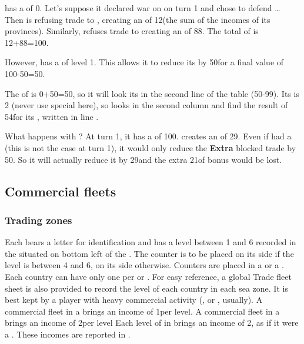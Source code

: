 
\begin{exemple}
  \POR has a  of 0. Let's suppose it declared
  war on \paysMaroc on turn 1 and \TUR chose to defend \paysMaroc\ldots
  Then \paysMaroc is refusing trade to \POR, creating an  of 12\ducats (the sum of the incomes of its
  provinces). Similarly, \TUR refuses trade to \POR creating an
   of 88\ducats. The total  of \POR is 12+88=100\ducats.

  However, \POR has a  \MNU of level 1. This allows it to
  reduce its  by 50\ducats for a final value
  of 100-50=50\ducats.

  The  of \POR is 0+50=50\ducats, so it will look
  its  in the second line of the table
  (50-99). Its \FTI is 2 (never use special \FTI here), so \POR looks in
  the second column and find the result of 54\ducats for its
  , written in line .

  What happens with \TUR? At turn 1, it has a  of 100\ducats. \POR creates an  of
  29\ducats. Even if \TUR had a  \MNU (this is not the case
  at turn 1), it would only reduce the \textbf{Extra} blocked trade by
  50\ducats. So it will actually reduce it by 29\ducats and the extra
  21\ducats of bonus would be lost.
\end{exemple}

\subsection{Commercial fleets}
\subsubsection{Trading zones}
\aparag Each \TradeFLEET bears a letter for identification and has a
level between 1 and 6 recorded in the 
situated on bottom left of the .
\bparag The counter is to be placed on its \Faceplus side if the level
is between 4 and 6, on its \Facemoins side otherwise.
\bparag Counters are placed in a \CTZ or a \STZ. Each country can have
only one \TradeFLEET per \CTZ or \STZ.
\bparag For easy reference, a global Trade fleet sheet is also provided
to record the level of each country in each sea zone. It is best kept by
a player with heavy commercial activity (\POR, \HOL or \ANG, usually).
\aparag A commercial fleet in a \STZ brings an income of 1\ducats per
level.
\bparag A commercial fleet in a \CTZ brings an income of 2\ducats per
level
 Each level of \TradeFLEET in 
brings an income of 2\ducats, as if it were a \CTZ.
\bparag These incomes are reported in .

